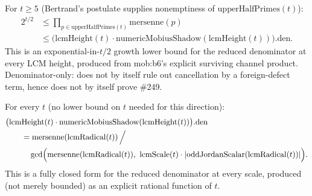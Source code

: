 \begin{prop}
For $t \ge 5$ (Bertrand's postulate supplies nonemptiness of $\mathrm{upperHalfPrimes}(t)$):
\[
\begin{aligned}
2^{t/2}
  &\le \prod_{p \in \mathrm{upperHalfPrimes}(t)} \mathrm{mersenne}(p) \\
  &\le \bigl(\mathrm{lcmHeight}(t)\cdot
    \mathrm{numericMobiusShadow}(\mathrm{lcmHeight}(t))\bigr).\mathrm{den}.
\end{aligned}
\]
This is an exponential-in-$t/2$ growth lower bound for the reduced denominator at every LCM height, produced from mob:b6's explicit surviving channel product. Denominator-only: does not by itself rule out cancellation by a foreign-defect term, hence does not by itself prove \#249.
\par\noindent{}   
\end{prop}

\begin{prop}
For every $t$ (no lower bound on $t$ needed for this direction):
\[
\begin{aligned}
&\bigl(\mathrm{lcmHeight}(t)\cdot
  \mathrm{numericMobiusShadow}(\mathrm{lcmHeight}(t))\bigr).\mathrm{den} \\
&\qquad = \mathrm{mersenne}(\mathrm{lcmRadical}(t))\,\Big/ \\
&\qquad\quad \gcd\Bigl(
  \mathrm{mersenne}(\mathrm{lcmRadical}(t)),
  \ \mathrm{lcmScale}(t)\cdot
  |\mathrm{oddJordanScalar}(\mathrm{lcmRadical}(t))|\Bigr).
\end{aligned}
\]
This is a fully closed form for the reduced denominator at every scale, produced (not merely bounded) as an explicit rational function of $t$.
\par\noindent{}   
\end{prop}

